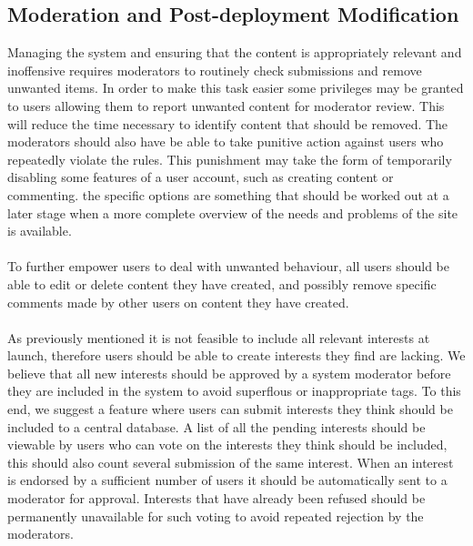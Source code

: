 \subsection{Moderation and Post-deployment Modification} %
\label{subsec:FurtherRequiredMod}

Managing the system and ensuring that the content is appropriately relevant and inoffensive requires moderators to routinely check submissions and remove unwanted items. In order to make this task easier some privileges may be granted to users allowing them to report unwanted content for moderator review.  This will reduce the time necessary to identify content that should be removed. The moderators should also have be able to take punitive action against users who repeatedly violate the rules. This punishment may take the form of temporarily disabling some features of a user account, such as creating content or commenting. the specific options are something that should be worked out at a later stage when a more complete overview of the needs and problems of the site is available.

\paragraph{} To further empower users to deal with unwanted behaviour, all users should be able to edit or delete content they have created, and possibly remove specific comments made by other users on content they have created.

\paragraph{} As previously mentioned it is not feasible to include all relevant interests at launch, therefore users should be able to create interests they find are lacking. We believe that all new interests should be approved by a system moderator before they are included in the system to avoid superflous or inappropriate tags. To this end, we suggest a feature where users can submit interests they think should be included to a central database. A list of all the pending interests should be viewable by users who can vote on the interests they think should be included, this should also count several submission of the same interest. When an interest is endorsed by a sufficient number of users it should be automatically sent to a moderator for approval. Interests that have already been refused should be permanently unavailable for such voting to avoid repeated rejection by the moderators.

